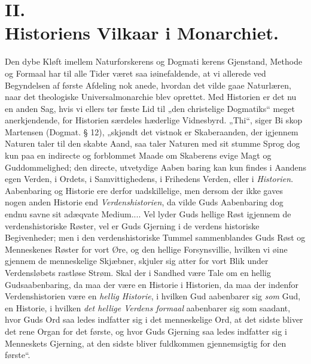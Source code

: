 \documentclass[12pt]{book}
\newcommand{\opage}[1]{\marginnote{\footnotesize\textit{[#1]}}}
\begin{document}
\opage{40}\setcounter{footnote}{0}%
\section*{II.\\ Historiens Vilkaar i Monarchiet.}

Den dybe Kløft imellem Naturforskerens og Dogmati\-%
kerens Gjenstand, Methode og Formaal har til alle Tider
været saa iøinefaldende, at vi allerede ved Begyndelsen af
første Afdeling nok anede, hvordan det vilde gaae Naturlæren,
naar det theologiske Universalmonarchie blev oprettet. Med
Historien er det nu en anden Sag, hvis vi ellers tør fæste
Lid til „den christelige Dogmatiks“ meget anerkjendende, for
Historien særdeles hæderlige Vidnesbyrd. „Thi“, siger Bi\-%
skop Martensen (Dogmat. § 12), „skjøndt det vistnok er
Skaberaanden, der igjennem Naturen taler til den skabte
Aand, saa taler Naturen med sit stumme Sprog dog kun
paa en indirecte og forblommet Maade om Skaberens evige
Magt og Guddommelighed; den directe, utvetydige Aaben\-%
baring kan kun findes i Aandens egen Verden, i Ordets,
i Samvittighedens, i Frihedens Verden, eller i \emph{Historien}.
Aabenbaring og Historie ere derfor uadskillelige, men dersom
der ikke gaves nogen anden Historie end \emph{Verdenshistorien},
da vilde Guds Aabenbaring dog endnu savne sit adæqvate
Medium.... Vel lyder Guds hellige Røst igjennem de
verdenshistoriske Røster, vel er Guds Gjerning i de verdens\-%
historiske Begivenheder; men i den verdenshistoriske Tummel
sammenblandes Guds Røst og Menneskenes Røster for vort
Øre, og den hellige Forsynsvillie, hvilken vi øine gjennem
de menneskelige Skjæbner, skjuler sig atter for vort Blik under
Verdensløbets rastløse Strøm. Skal der i Sandhed være
Tale om en hellig Gudsaabenbaring, da maa der være en
Historie i Historien, da maa der indenfor Verdenshistorien
være en \emph{hellig Historie}, i hvilken Gud aabenbarer sig
\emph{som} Gud, en Historie, i hvilken \emph{det hellige Verdens\-%
formaal} aabenbarer sig som saadant, hvor Guds Ord saa\-%
ledes indfatter sig i det menneskelige Ord, at det sidste bliver
\opage{41}\setcounter{footnote}{0}%
det rene Organ for det første, og hvor Guds Gjerning saa\-%
ledes indfatter sig i Menneskets Gjerning, at den sidste bliver
fuldkommen gjennemsigtig for den første“.
\end{document}
